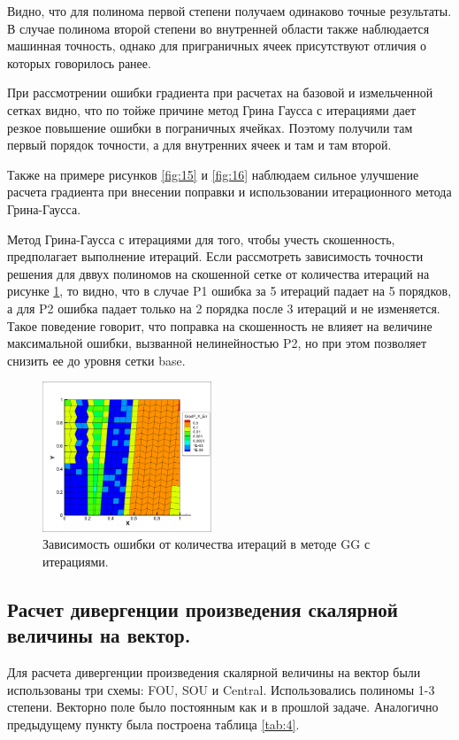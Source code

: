 Видно, что для полинома первой степени получаем одинаково точные результаты. В случае полинома второй степени во внутренней области также наблюдается машинная точность, однако для приграничных ячеек присутствуют отличия о которых говорилось ранее. 

При рассмотрении ошибки градиента при расчетах на базовой и измельченной сетках видно, что по тойже причине метод Грина Гаусса с итерациями дает резкое повышение ошибки в пограничных ячейках. Поэтому получили там первый порядок точности, а для внутренних ячеек и там и там второй.


Также на примере рисунков \ref{fig:15} и \ref{fig:16} наблюдаем сильное улучшение расчета градиента при внесении поправки и использовании итерационного метода Грина-Гаусса.

Метод Грина-Гаусса с итерациями для того, чтобы учесть скошенность, предполагает выполнение итераций. Если рассмотреть зависимость точности решения для дввух полиномов на скошенной сетке от количества итераций на рисунке \ref{fig:17}, то видно, что в случае P1 ошибка за 5 итераций падает на 5 порядков, а для P2 ошибка падает только на 2 порядка после 3 итераций и не изменяется. Такое поведение говорит, что поправка на скошенность не влияет на величине максимальной ошибки, вызванной нелинейностью P2, но при этом позволяет снизить ее до уровня сетки base.

\begin{figure}[H]
    \centering
    \includegraphics[width=0.45\textwidth]{img/16.1.png}
    \caption{Зависимость ошибки от количества итераций в методе GG с итерациями.}
    \label{fig:17}
\end{figure}

\subsection{Расчет дивергенции произведения скалярной величины на вектор.}

Для расчета дивергенции произведения скалярной величины на вектор были использованы три схемы: FOU, SOU и Central. Использовались полиномы 1-3 степени. Векторно поле было постоянным как и в прошлой задаче. Аналогично предыдущему пункту была построена таблица \ref{tab:4}.


